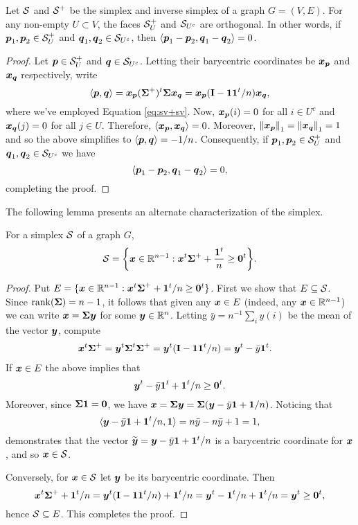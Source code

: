 \begin{lemma}
\label{lem:faces_orthogonal}
Let $\mathcal{S}$ and $\mathcal{S}^+$ be the simplex and inverse simplex of a graph $G=(V,E)$. For any non-empty $U\subset V$,  
the faces $\mathcal{S}^+_U$ and $\mathcal{S}_{U^c}$ are orthogonal. In other words, if $\vb*{p}_1,\vb*{p}_2\in \mathcal{S}_U^+$ and $\vb*{q}_1,\vb*{q}_2\in \mathcal{S}_{U^c}$, then $\langle \vb*{p}_1-\vb*{p}_2,\vb*{q}_1-\vb*{q}_2\rangle=0$. 
\end{lemma}
\begin{proof}
Let $\vb*{p}\in \mathcal{S}^+_U$ and $\vb*{q}\in \mathcal{S}_{U^c}$. Letting their barycentric coordinates be $\vb*{x}_{\vb*{p}}$ and $\vb*{x}_{\vb*{q}}$ respectively, write 
\[\langle \vb*{p},\vb*{q}\rangle = \vb*{x}_{\vb*{p}} (\boldsymbol{\Sigma}^+)^t \boldsymbol{\Sigma} \vb*{x}_{\vb*{q}}=\vb*{x}_{\vb*{p}}(\vb{I}-\vb{1}\vb{1}^t/n) \vb*{x}_{\vb*{q}},\]
where we've employed Equation \eqref{eq:sv+sv}. Now, $\vb*{x}_{\vb*{p}}(i)=0$ for all $i\in U^c$ and $\vb*{x}_{\vb*{q}}(j)=0$ for all $j\in U$. Therefore, $\langle \vb*{x}_{\vb*{p}},\vb*{x}_{\vb*{q}}\rangle =0$. Moreover, $\norm{\vb*{x}_{\vb*{p}}}_1=\norm{\vb*{x}_{\vb*{q}}}_1=1$ and so the above simplifies to $\langle \vb*{p},\vb*{q}\rangle = -1/n$. Consequently, if $\vb*{p}_1,\vb*{p}_2\in \mathcal{S}_U^+$ and $\vb*{q}_1,\vb*{q}_2\in\mathcal{S}_{U^c}$ we have 
\[\langle \vb*{p}_1-\vb*{p}_2,\vb*{q}_1-\vb*{q}_2\rangle = 0,\]
completing the proof. 
\end{proof}

The following lemma presents an alternate characterization of the simplex. 

\begin{lemma}
\label{lem:S_alt_desc}
For a simplex $\mathcal{S}$ of a graph $G$, 
\begin{equation}
\label{eq:S_alt_desc}
    \mathcal{S}=\bigg\{\vb*{x}\in \mathbb{R}^{n-1}:\vb*{x}^t\boldsymbol{\Sigma}^++\frac{\vb{1}^t}{n}\geq \vb{0}^t\bigg\}.
\end{equation}
\end{lemma}
\begin{proof}
Put $E=\{\vb*{x}\in \mathbb{R}^{n-1}:\vb*{x}^t\boldsymbol{\Sigma}^++\vb{1}^t/n\geq \vb{0}^t\}$. First we show that $E\subseteq\mathcal{S}$. 
Since $\rank(\boldsymbol{\Sigma})=n-1$, it follows that given any $\vb*{x}\in E$ (indeed, any $\vb*{x}\in\mathbb{R}^{n-1}$) we can write $\vb*{x}=\boldsymbol{\Sigma}\vb*{y}$ for some $\vb*{y}\in\mathbb{R}^n$. Letting $\bar{y}=n^{-1}\sum_i y(i)$ be the mean of the vector $\vb*{y}$, compute
\begin{align*}
    \vb*{x}^t\boldsymbol{\Sigma}^+ &= \vb*{y}^t \boldsymbol{\Sigma}^t\boldsymbol{\Sigma}^+ = \vb*{y}^t(\vb{I}-\vb{1}\vb{1}^t/n)=\vb*{y}^t - \bar{y}\vb{1}^t.
\end{align*}
If $\vb*{x}\in E$ the above implies that 
\[\vb*{y}^t-\bar{y}\vb{1}^t + \vb{1}^t/n\geq \vb{0}^t.\]
Moreover, since $\boldsymbol{\Sigma}\vb{1}=\vb{0}$, we have $\vb*{x}=\boldsymbol{\Sigma}\vb*{y}=\boldsymbol{\Sigma}(\vb*{y}-\bar{y}\vb{1} +\vb{1}/n)$. Noticing that 
\[\langle \vb*{y}-\bar{y}\vb{1}+\vb{1}^t/n,\vb{1}\rangle = n\bar{y}-n\bar{y}+1=1,\]
demonstrates that the vector $\widetilde{\vb*{y}}=\vb*{y}-\bar{y}\vb{1}+\vb{1}^t/n$ is a barycentric coordinate for $\vb*{x}$, and so $\vb*{x}\in \mathcal{S}$. 

Conversely, for $\vb*{x}\in\mathcal{S}$ let $\vb*{y}$ be its barycentric coordinate. Then 
\[\vb*{x}^t\boldsymbol{\Sigma}^++\vb{1}^t/n=\vb*{y}^t(\vb{I}-\vb{1}\vb{1}^t/n)+\vb{1}^t/n=\vb*{y}^t - \vb{1}^t/n+\vb{1}^t/n=\vb*{y}^t\geq \vb{0}^t, \]
hence $\mathcal{S}\subseteq E$. This completes the proof. 
\end{proof}

